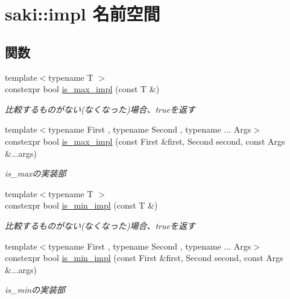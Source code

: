 \hypertarget{namespacesaki_1_1impl}{}\section{saki\+:\+:impl 名前空間}
\label{namespacesaki_1_1impl}
\subsection*{関数}
\begin{DoxyCompactItemize}
\item 
{\footnotesize template$<$typename T $>$ }\\constexpr bool \mbox{\hyperlink{namespacesaki_1_1impl_a1eb562842d6a5bcde39a463f04755157}{is\+\_\+max\+\_\+impl}} (const T \&)
\begin{DoxyCompactList}\small\item\em 比較するものがない(なくなった)場合、trueを返す \end{DoxyCompactList}\item 
{\footnotesize template$<$typename First , typename Second , typename ... Args$>$ }\\constexpr bool \mbox{\hyperlink{namespacesaki_1_1impl_ad5f6398b5affbb107eb4e49c35e36e6a}{is\+\_\+max\+\_\+impl}} (const First \&first, Second second, const Args \&...args)
\begin{DoxyCompactList}\small\item\em is\+\_\+maxの実装部 \end{DoxyCompactList}\item 
{\footnotesize template$<$typename T $>$ }\\constexpr bool \mbox{\hyperlink{namespacesaki_1_1impl_ac84f4d7f2170d7090fc5e9fb79c21b7f}{is\+\_\+min\+\_\+impl}} (const T \&)
\begin{DoxyCompactList}\small\item\em 比較するものがない(なくなった)場合、trueを返す \end{DoxyCompactList}\item 
{\footnotesize template$<$typename First , typename Second , typename ... Args$>$ }\\constexpr bool \mbox{\hyperlink{namespacesaki_1_1impl_a97640b18d57a2a6ea4746acc3cd62bbb}{is\+\_\+min\+\_\+impl}} (const First \&first, Second second, const Args \&...args)
\begin{DoxyCompactList}\small\item\em is\+\_\+minの実装部 \end{DoxyCompactList}\item 

\end{DoxyCompactItemize}
